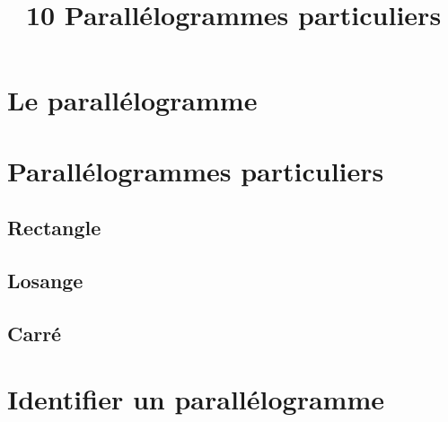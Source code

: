 \documentclass[12pt,a4paper]{article}
\date{}
\title{\textcircled{{\normalsize{10}}} Parallélogrammes particuliers}
\begin{document}
	\maketitle





\section{Le parallélogramme}

%



\section{Parallélogrammes particuliers}

	\subsection{Rectangle}
		
		
		
	\subsection{Losange}
		
	
	\subsection{Carré}
		

\newpage
	
\section{Identifier un parallélogramme}	
	
	
	
	
\end{document}
